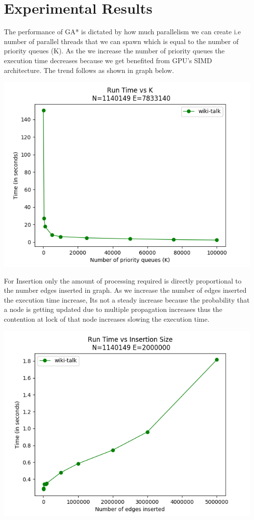 \documentclass[a4paper]{article}
\begin{document}
\section{Experimental Results}

The performance of GA* \cite{GA*} is dictated by how much parallelism we can create i.e number of parallel threads that we can spawn which is equal to the number of priority queues (K). As the we increase the number of priority queues the execution time decreases because we get benefited from GPU's SIMD architecture. The trend follows as shown in graph below.
\begin{center}
\includegraphics[scale=0.45]{img/RvK.png}        
\end{center}
For Insertion only the amount of processing required is directly proportional to the number edges inserted in graph. As we increase the number of edges inserted the execution time increase, Its not a steady increase because the probability that a node is getting updated due to multiple propagation increases thus the contention at lock of that node increases slowing the execution time.
\begin{center}
\includegraphics[scale=0.45]{img/IvK.png}        
\end{center}
\end{document}
